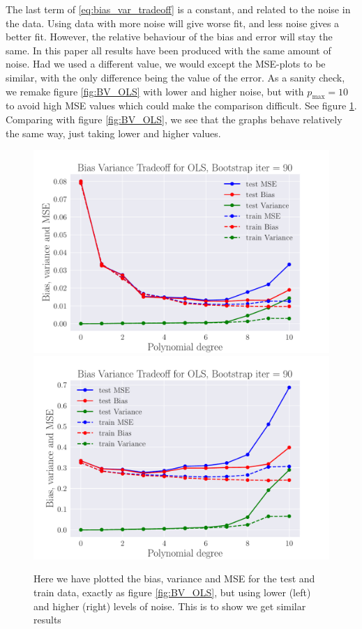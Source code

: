 \documentclass[reprint,english,notitlepage,aps,nobalancelastpage,nofootinbib]{revtex4-1}  %
\begin{document}
The last term of \eqref{eq:bias_var_tradeoff} is a constant, and related to the noise in the data. Using data with more noise will give worse fit, and less noise gives a better fit. However, the relative behaviour of the bias and error will stay the same.  In this paper all results have been produced with the same amount of noise. Had we used a different value, we would except the MSE-plots to be similar, with the only difference being the value of the error. As a sanity check, we remake figure \ref{fig:BV_OLS} with lower and higher noise, but with $p_\text{max}=10$ to avoid high MSE values which could make the comparison difficult. See figure \ref{fig:BV_OLS_noise}. Comparing with figure \ref{fig:BV_OLS}, we see that the graphs behave relatively the same way, just taking lower and higher values.

\begin{figure}[h]
	\includegraphics[width=\linewidth]{BVT_OLS_n30_eps0_1.pdf}
	\endminipage\hfill
	\includegraphics[width=\linewidth]{BVT_OLS_n30_eps0_5.pdf}
	\endminipage
	\caption{Here we have plotted the bias, variance and MSE for the test and train data, exactly as figure \ref{fig:BV_OLS}, but using lower (left) and higher (right) levels of noise. This is to show we get similar results} \label{fig:BV_OLS_noise}
\end{figure}
\end{document}
